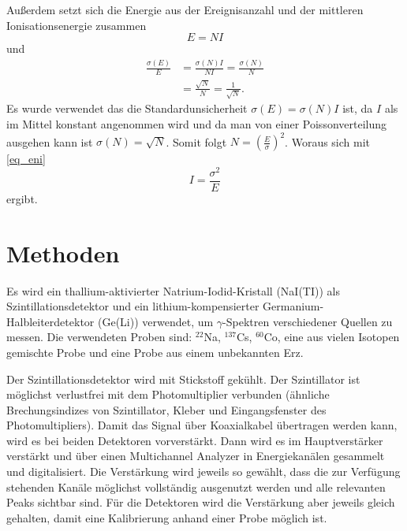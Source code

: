 \documentclass[
	a4paper,
	12pt,
	pagesize,
	ngerman
]{scrartcl}
\begin{document}
	Außerdem setzt sich die Energie aus der Ereignisanzahl und der mittleren Ionisationsenergie zusammen
	\begin{equation}
		\label{eq_eni}
		E=N I
	\end{equation}
	und
	\begin{align}
		\frac{\sigma(E)}{E} &= \frac{\sigma(N) I}{N I}= \frac{\sigma(N)}{N} \\
		&= \frac{\sqrt{N}}{N} = \frac{1}{\sqrt{N}}.
	\end{align}
	Es wurde verwendet das die Standardunsicherheit $\sigma(E)=\sigma(N)I$ ist, da $I$ als im Mittel konstant angenommen wird und da man von einer Poissonverteilung ausgehen kann ist $\sigma(N)=\sqrt{N}$.
	Somit folgt $N = \left(\frac{E}{\sigma}\right)^2$.
	Woraus sich mit \cref{eq_eni}
	\begin{equation}
		I = \frac{\sigma^2}{E}
	\end{equation}
	ergibt.

	\section{Methoden}

	Es wird ein thallium-aktivierter Natrium-Iodid-Kristall (NaI(TI)) als Szintillationsdetektor und  ein lithium-kompensierter Germanium-Halbleiterdetektor (Ge(Li)) verwendet, um $\gamma$-Spektren verschiedener Quellen zu messen.
	Die verwendeten Proben sind: $^{22}$Na, $^{137}$Cs, $^{60}$Co, eine aus vielen Isotopen gemischte Probe und eine Probe aus einem unbekannten Erz.

	Der Szintillationsdetektor wird mit Stickstoff gekühlt.
	Der Szintillator ist möglichst verlustfrei mit dem Photomultiplier verbunden (ähnliche Brechungsindizes von Szintillator, Kleber und Eingangsfenster des Photomultipliers).
	Damit das Signal über Koaxialkabel übertragen werden kann, wird es bei beiden Detektoren vorverstärkt.
	Dann wird es im Hauptverstärker verstärkt und über einen Multichannel Analyzer in Energiekanälen gesammelt und digitalisiert.
	Die Verstärkung wird jeweils so gewählt, dass die zur Verfügung stehenden Kanäle möglichst vollständig ausgenutzt werden und alle relevanten Peaks sichtbar sind.
	Für die Detektoren wird die Verstärkung aber jeweils gleich gehalten, damit eine Kalibrierung anhand einer Probe möglich ist.
\end{document}
